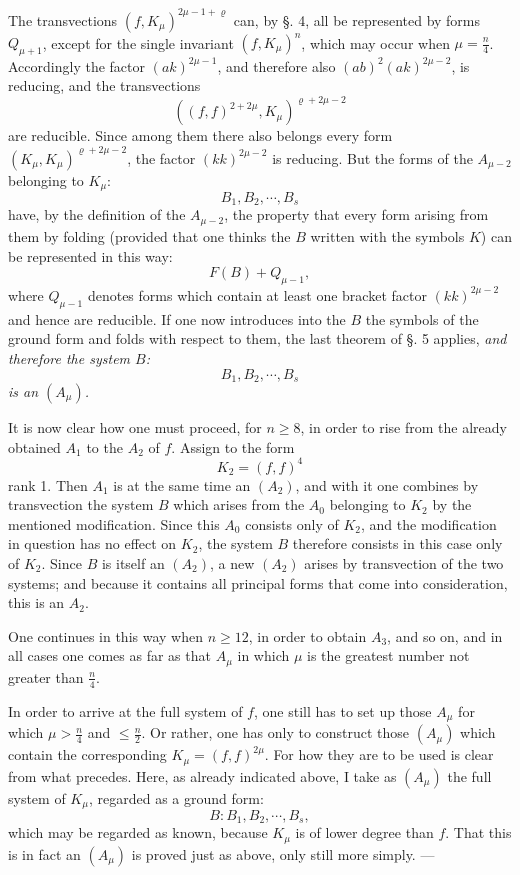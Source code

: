 \documentclass[10pt]{article}
\providecommand{\bdots}{\cdots}
\begin{document}
The transvections $(f,K_\mu)^{2\mu-1+\varrho}$ can, by §. 4, all be represented by forms $Q_{\mu+1}$, except for the single invariant $(f,K_\mu)^n$, which may occur when $\mu=\frac n4$. Accordingly the factor $(ak)^{2\mu-1}$, and therefore also $(ab)^2(ak)^{2\mu-2}$, is reducing, and the transvections
\[
((f,f)^{2+2\mu},K_\mu)^{\varrho+2\mu-2}
\]
are reducible. Since among them there also belongs every form $(K_\mu,K_\mu)^{\varrho+2\mu-2}$, the factor $(kk)^{2\mu-2}$ is reducing. But the forms of the $A_{\mu-2}$ belonging to $K_\mu$:
\[
B_1,B_2,\bdots,B_s
\]
have, by the definition of the $A_{\mu-2}$, the property that every form arising from them by folding (provided that one thinks the $B$ written with the symbols $K$) can be represented in this way:
\[
F(B)+Q_{\mu-1},
\]
where $Q_{\mu-1}$ denotes forms which contain at least one bracket factor $(kk)^{2\mu-2}$ and hence are reducible. If one now introduces into the $B$ the symbols of the ground form and folds with respect to them, the last theorem of §. 5 applies, \textit{and therefore the system $B$:}
\[
B_1,B_2,\bdots,B_s
\]
\textit{is an $(A_\mu)$.}

It is now clear how one must proceed, for $n\geq8$, in order to rise from the already obtained $A_1$ to the $A_2$ of $f$. Assign to the form
\[
K_2=(f,f)^4
\]
rank 1. Then $A_1$ is at the same time an $(A_2)$, and with it one combines by transvection the system $B$ which arises from the $A_0$ belonging to $K_2$ by the mentioned modification. Since this $A_0$ consists only of $K_2$, and the modification in question has no effect on $K_2$, the system $B$ therefore consists in this case only of $K_2$. Since $B$ is itself an $(A_2)$, a new $(A_2)$ arises by transvection of the two systems; and because it contains all principal forms that come into consideration, this is an $A_2$.

One continues in this way when $n\geq12$, in order to obtain $A_3$, and so on, and in all cases one comes as far as that $A_\mu$ in which $\mu$ is the greatest number not greater than $\frac n4$.

In order to arrive at the full system of $f$, one still has to set up those $A_\mu$ for which $\mu>\frac n4$ and $\leq\frac n2$. Or rather, one has only to construct those $(A_\mu)$ which contain the corresponding $K_\mu=(f,f)^{2\mu}$. For how they are to be used is clear from what precedes. Here, as already indicated above, I take as $(A_\mu)$ the full system of $K_\mu$, regarded as a ground form:
\[
B:B_1,B_2,\bdots,B_s,
\]
which may be regarded as known, because $K_\mu$ is of lower degree than $f$. That this is in fact an $(A_\mu)$ is proved just as above, only still more simply. ---
\end{document}
